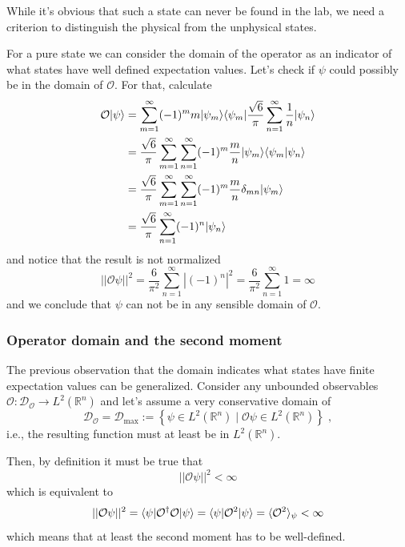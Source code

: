 While it's obvious that such a state can never be found in the lab, we need a criterion to distinguish the physical from the unphysical states.

For a pure state we can consider the domain of the operator as an indicator of what states have well defined expectation values. Let's check if $\psi$ could possibly be in the domain of $\mathcal{O}$. For that, calculate
\begin{equation}
	\begin{split}
		\mathcal{O} | \psi \rangle &= \sum_{m=1}^{\infty} (-1)^{m} m | \psi_{m} \rangle \langle \psi_{m} | \frac{ \sqrt{6} }{ \pi } \sum_{n=1}^{\infty} \frac{ 1 }{ n } | \psi_{n} \rangle \\
		&= \frac{ \sqrt{6} }{ \pi } \sum_{m=1}^{\infty} \sum_{n=1}^{\infty} (-1)^{m} \frac{ m }{ n } | \psi_{m} \rangle \langle \psi_{m} | \psi_{n} \rangle \\
		&= \frac{ \sqrt{6} }{ \pi } \sum_{m=1}^{\infty} \sum_{n=1}^{\infty} (-1)^{m} \frac{ m }{ n } \delta_{mn} | \psi_{m} \rangle \\
		&= \frac{ \sqrt{6} }{ \pi } \sum_{n=1}^{\infty} (-1)^{n} | \psi_{n} \rangle
	\end{split}
\end{equation}
and notice that the result is not normalized
\begin{equation}
	|| \mathcal{O} \psi ||^{2} = \frac{ 6 }{ \pi^{2} } \sum_{n=1}^{\infty} | (-1)^{n} |^{2} = \frac{ 6 }{ \pi^{2} } \sum_{n=1}^{\infty} 1 = \infty
\end{equation}
and we conclude that $\psi$ can not be in any sensible domain of $\mathcal{O}$.


\subsubsection{Operator domain and the second moment}
The previous observation that the domain indicates what states have finite expectation values can be generalized. Consider any unbounded observables $\mathcal{O} : \mathcal{D}_{\mathcal{O}} \to L^{2}(\mathbb{R}^{n})$ and let's assume a very conservative domain of
\begin{equation}
	\mathcal{D}_{\mathcal{O}} = \mathcal{D}_{\mathrm{max}} := \left\{ \psi \in L^{2}(\mathbb{R}^{n}) \; | \;  \mathcal{O} \psi \in L^{2}(\mathbb{R}^{n}) \right\} \; ,
\end{equation}
i.e., the resulting function must at least be in $L^{2}(\mathbb{R}^{n})$.

Then, by definition it must be true that
\begin{equation}
	|| \mathcal{O} \psi ||^{2} < \infty
\end{equation}
which is equivalent to
\begin{equation}
	|| \mathcal{O} \psi ||^{2} = \langle \psi | \mathcal{O}^{\dagger} \mathcal{O} | \psi \rangle = \langle \psi | \mathcal{O}^{2} | \psi \rangle = \langle \mathcal{O}^{2} \rangle_{\psi} < \infty
\end{equation}
which means that at least the second moment has to be well-defined.

